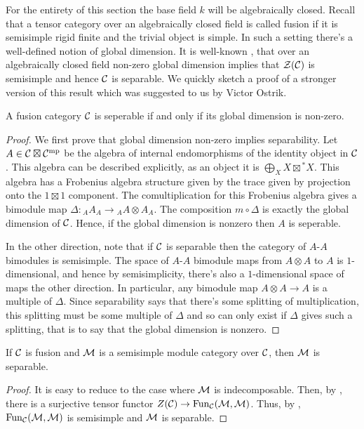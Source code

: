 \documentclass{amsart}
\begin{document}
For the entirety of this section the base field $k$ will be algebraically closed.  Recall that a tensor category over an algebraically closed field is called fusion if it is semisimple rigid finite and the trivial object is simple.  In such a setting there's a well-defined notion of global dimension.  It is well-known \cite{???}, that over an algebraically closed field non-zero global dimension implies that $\mathcal Z(\mathcal C)$ is semisimple and hence $\mathcal C$ is separable.  We quickly sketch a proof of a stronger version of this result which was suggested to us by Victor Ostrik.

\begin{theorem} \label{thm:NonzeroDimension}
A fusion category $\mathcal C$ is seperable if and only if its global dimension is non-zero.
\end{theorem}
\begin{proof}
We first prove that global dimension non-zero implies separability.  Let $A \in \mathcal C \boxtimes \mathcal C^{\mathrm{mp}}$ be the algebra of internal endomorphisms of the identity object in $\mathcal C$.  This algebra can be described explicitly, as an object it is $\bigoplus_X X \boxtimes {}^*X$.  This algebra has a Frobenius algebra structure given by the trace given by projection onto the $1 \boxtimes 1$ component.  The comultiplication for this Frobenius algebra gives a bimodule map $\Delta: {}_A A_A \rightarrow {}_A A \otimes A_A$.  The composition $m \circ \Delta$ is exactly the global dimension of $\mathcal C$.  Hence, if the global dimension is nonzero then $A$ is seperable.

In the other direction, note that if $\mathcal C$ is separable then the category of $A$-$A$ bimodules is semisimple.  The space of $A$-$A$ bimodule maps from $A \otimes A$ to $A$  is $1$-dimensional, and hence by semisimplicity, there's also a $1$-dimensional space of maps the other direction.  In particular, any bimodule map $A \otimes A \rightarrow A$ is a multiple of $\Delta$.  Since separability says that there's some splitting of multiplication, this splitting must be some multiple of $\Delta$ and so can only exist if $\Delta$ gives such a splitting, that is to say that the global dimension is nonzero.
\end{proof}


\begin{theorem} \label{thm:SSModuleCatsAreSep}
If $\mathcal C$ is fusion and $\mathcal M$ is a semisimple module category over $\mathcal C$, then $\mathcal M$ is separable.
\end{theorem}
\begin{proof}
It is easy to reduce to the case where $\mathcal M$ is indecomposable.  Then, by \cite{???}, there is a surjective tensor functor $Z(\mathcal C) \rightarrow \operatorname{Fun}_\mathcal C(\mathcal M, \mathcal M)$.  Thus, by \cite{???}, $\operatorname{Fun}_\mathcal C(\mathcal M, \mathcal M)$ is semisimple and $\mathcal M$ is separable.
\end{proof}
\end{document}
